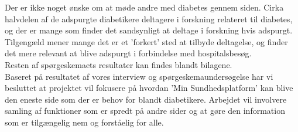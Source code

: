 Der er ikke noget ønske om at møde andre med diabetes gennem siden. Cirka halvdelen af de adspurgte diabetikere deltagere i forskning relateret til diabetes, og der er mange som finder det sandsynligt at deltage i forskning hvis adspurgt. Tilgengæld mener mange det er et 'forkert' sted at tilbyde deltagelse, og finder det mere relevant at blive adspurgt i forbindelse med hospitalsbesøg.\\
Resten af spørgeskemaets resultater kan findes blandt bilagene.\\

Baseret på resultatet af vores interview og spørgeskemaundersøgelse har vi besluttet at projektet vil fokusere på hvordan 'Min Sundhedsplatform' kan blive den eneste side som der er behov for blandt diabetikere. Arbejdet vil involvere samling af funktioner som er spredt på andre sider og at gøre den information som er tilgængelig nem og forståelig for alle.